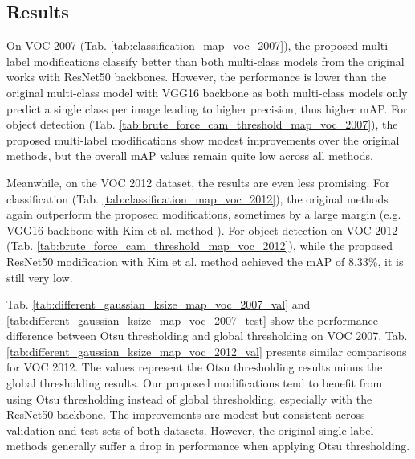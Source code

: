 \documentclass[conference]{IEEEtran}
\begin{document}
\subsection{Results}

On VOC 2007 (Tab. \ref{tab:classification_map_voc_2007}), the proposed multi-label modifications classify better than both multi-class models from the original works \cite{zhou2015cnnlocalization} \cite{kim2022bridging} with ResNet50 backbones. However, the performance is lower than the original multi-class model with VGG16 backbone as both multi-class models only predict a single class per image leading to higher precision, thus higher mAP. For object detection (Tab. \ref{tab:brute_force_cam_threshold_map_voc_2007}), the proposed multi-label modifications show modest improvements over the original methods, but the overall mAP values remain quite low across all methods.

Meanwhile, on the VOC 2012 dataset, the results are even less promising. For classification (Tab. \ref{tab:classification_map_voc_2012}), the original methods again outperform the proposed modifications, sometimes by a large margin (e.g. VGG16 backbone with Kim et al. method \cite{kim2022bridging}). For object detection on VOC 2012 (Tab. \ref{tab:brute_force_cam_threshold_map_voc_2012}), while the proposed ResNet50 modification with Kim et al. method \cite{kim2022bridging} achieved the mAP of 8.33\%, it is still very low.

Tab. \ref{tab:different_gaussian_ksize_map_voc_2007_val} and \ref{tab:different_gaussian_ksize_map_voc_2007_test} show the performance difference between Otsu thresholding and global thresholding on VOC 2007. Tab. \ref{tab:different_gaussian_ksize_map_voc_2012_val} presents similar comparisons for VOC 2012. The values represent the Otsu thresholding results minus the global thresholding results. Our proposed modifications tend to benefit from using Otsu thresholding instead of global thresholding, especially with the ResNet50 backbone. The improvements are modest but consistent across validation and test sets of both datasets. However, the original single-label methods generally suffer a drop in performance when applying Otsu thresholding.
\end{document}
